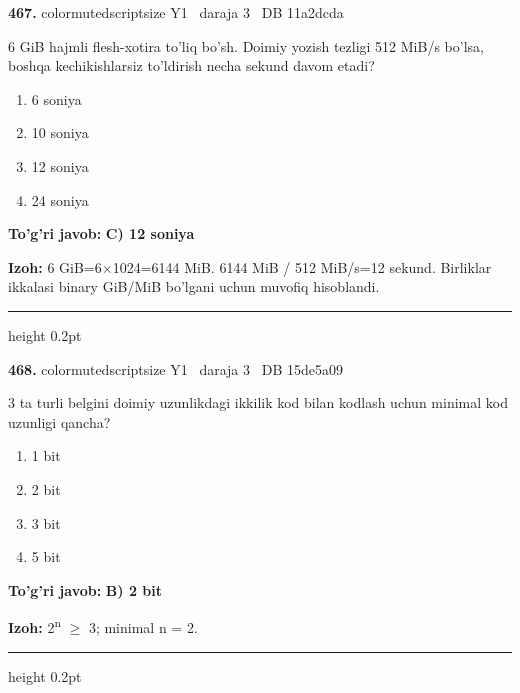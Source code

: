 \documentclass[10pt,a4paper,oneside]{article}
\begin{document}
\noindent\textbf{\color{ink}467.}  {color{muted}scriptsize Y1 \textbullet\ daraja 3 \textbullet\ DB 11a2dcda}
\par
6 GiB hajmli flesh-xotira to'liq bo'sh. Doimiy yozish tezligi 512 MiB/s bo'lsa, boshqa kechikishlarsiz to'ldirish necha sekund davom etadi?
\begin{enumerate}[label=\Alph*),leftmargin=9mm]
\item 6 soniya
\item 10 soniya
\item 12 soniya
\item 24 soniya
\end{enumerate}
\begin{tcolorbox}[enhanced,breakable,colback=teal!4,colframe=teal!50!black,boxrule=0.5pt,arc=1.1mm,left=3mm,right=3mm,top=1.7mm,bottom=1.7mm,before skip=2mm,after skip=2mm]
\textbf{\color{teal}To'g'ri javob:} \textbf{C) 12 soniya}
\par\smallskip
\textbf{Izoh:} 6 GiB=6\ensuremath{\times}1024=6144 MiB. 6144 MiB / 512 MiB/s=12 sekund. Birliklar ikkalasi binary GiB/MiB bo'lgani uchun muvofiq hisoblandi.
\end{tcolorbox}
\vspace{2mm}\hrule height 0.2pt \vspace{3mm}

\noindent\textbf{\color{ink}468.}  {color{muted}scriptsize Y1 \textbullet\ daraja 3 \textbullet\ DB 15de5a09}
\par
3 ta turli belgini doimiy uzunlikdagi ikkilik kod bilan kodlash uchun minimal kod uzunligi qancha?
\begin{enumerate}[label=\Alph*),leftmargin=9mm]
\item 1 bit
\item 2 bit
\item 3 bit
\item 5 bit
\end{enumerate}
\begin{tcolorbox}[enhanced,breakable,colback=teal!4,colframe=teal!50!black,boxrule=0.5pt,arc=1.1mm,left=3mm,right=3mm,top=1.7mm,bottom=1.7mm,before skip=2mm,after skip=2mm]
\textbf{\color{teal}To'g'ri javob:} \textbf{B) 2 bit}
\par\smallskip
\textbf{Izoh:} 2\textsuperscript{n} \ensuremath{\geq} 3; minimal n = 2.
\end{tcolorbox}
\vspace{2mm}\hrule height 0.2pt \vspace{3mm}
\end{document}

